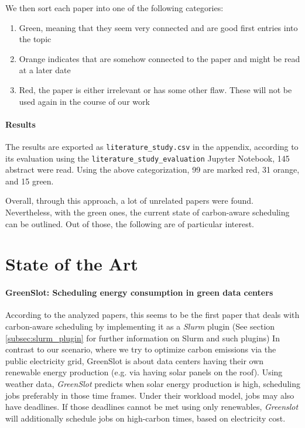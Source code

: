 We then sort each paper into one of the following categories:

\begin{enumerate}
    \item Green, meaning that they seem very connected and are good first entries into the topic
    \item Orange indicates that are somehow connected to the paper and might be read at a later date
    \item Red, the paper is either irrelevant or has some other flaw. These will not be used again in the course of our work
\end{enumerate}

\paragraph{Results}

The results are exported as \verb|literature_study.csv| in the appendix, according to its evaluation using the \verb|literature_study_evaluation| Jupyter Notebook, 145 abstract were read. 
Using the above categorization, 99 are marked red, 31 orange, and 15 green.

Overall, through this approach, a lot of unrelated papers were found.
Nevertheless, with the green ones, the current state of carbon-aware scheduling can be outlined.
Out of those, the following are of particular interest.

\section{State of the Art}

\paragraph{GreenSlot: Scheduling energy consumption in green data centers\cite{inigo_goiri_greenslot_2011}} According to the analyzed papers, this seems to be the first paper that deals with carbon-aware scheduling by implementing it as a \emph{Slurm} plugin (See section \ref{subsec:slurm_plugin} for further information on Slurm and such plugins)
In contrast to our scenario, where we try to optimize carbon emissions via the public electricity grid, GreenSlot is about data centers having their own renewable energy production (e.g. via having solar panels on the roof). 
Using weather data, \emph{GreenSlot} predicts when solar energy production is high, scheduling jobs preferably in those time frames.
Under their workload model, jobs may also have deadlines.
If those deadlines cannot be met using only renewables, \emph{Greenslot} will additionally schedule jobs on high-carbon times, based on electricity cost.

